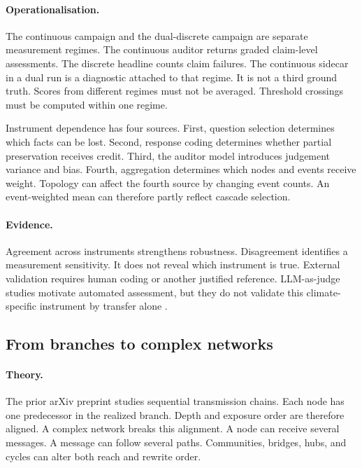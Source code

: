 \paragraph{Operationalisation.}
The continuous campaign and the dual-discrete campaign are separate measurement regimes.
The continuous auditor returns graded claim-level assessments.
The discrete headline counts claim failures.
The continuous sidecar in a dual run is a diagnostic attached to that regime.
It is not a third ground truth.
Scores from different regimes must not be averaged.
Threshold crossings must be computed within one regime.

Instrument dependence has four sources.
First, question selection determines which facts can be lost.
Second, response coding determines whether partial preservation receives credit.
Third, the auditor model introduces judgement variance and bias.
Fourth, aggregation determines which nodes and events receive weight.
Topology can affect the fourth source by changing event counts.
An event-weighted mean can therefore partly reflect cascade selection.

\paragraph{Evidence.}
Agreement across instruments strengthens robustness.
Disagreement identifies a measurement sensitivity.
It does not reveal which instrument is true.
External validation requires human coding or another justified reference.
LLM-as-judge studies motivate automated assessment, but they do not validate this climate-specific instrument by transfer alone \parencite{zheng2023judge}.

\subsection{From branches to complex networks}
\label{subsec:complex-network-generalization}

\paragraph{Theory.}
The prior arXiv preprint studies sequential transmission chains.
Each node has one predecessor in the realized branch.
Depth and exposure order are therefore aligned.
A complex network breaks this alignment.
A node can receive several messages.
A message can follow several paths.
Communities, bridges, hubs, and cycles can alter both reach and rewrite order.


